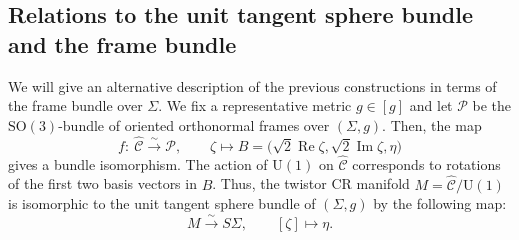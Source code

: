 \documentclass[pdftex]{sigma}
\newcommand{\wh}{\widehat}
\numberwithin{equation}{section}
\begin{document}
\subsection{Relations to the unit tangent sphere bundle and the frame bundle}\label{sphere-bundle}
We will give an alternative description of the previous constructions in terms of the frame bundle over $\Sigma$.
We fix a representative metric $g\in[g]$ and let
$\mathcal{P}$ be the $\mathrm{SO}(3)$-bundle of oriented orthonormal frames over $(\Sigma, g)$. Then, the map
\begin{equation}\label{isom-C-hat}
f\colon\ \wh{\mathcal{C}}\overset{\sim}{\longrightarrow} \mathcal{P}, \qquad
\zeta \longmapsto B=\bigl(\sqrt{2}\operatorname{Re}\zeta, \sqrt{2}\operatorname{Im}\zeta, \eta\bigr)
\end{equation}
gives a bundle isomorphism. The action of $\mathrm{U}(1)$ on $\wh{\mathcal{C}}$ corresponds to rotations of the first two basis vectors in $B$. Thus, the twistor CR manifold $M= \wh{\mathcal{C}}/\mathrm{U}(1)$ is isomorphic to the unit tangent sphere bundle of $(\Sigma, g)$ by the following map:
\begin{equation}\label{M-isom}
M \overset{\sim}{\longrightarrow} S\Sigma, \qquad
[\zeta]\longmapsto \eta.
\end{equation}
\end{document}
